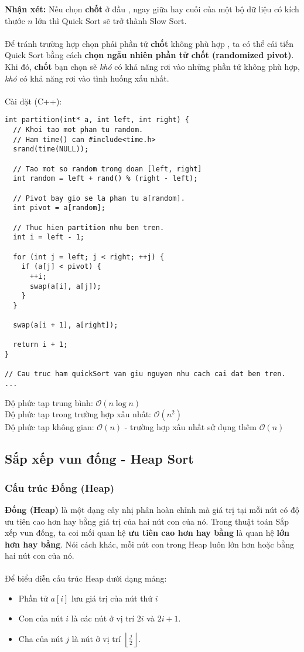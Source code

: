 \documentclass[]{article}
\begin{document}
\textbf{Nhận xét:} Nếu chọn \textbf{chốt} ở đầu , ngay giữa hay cuối của một bộ dữ liệu có kích thước $n$ lớn thì Quick Sort sẽ trở thành Slow Sort.
\\\\
Để tránh trường hợp chọn phải phần tử \textbf{chốt} không phù hợp , ta có thể cải tiến Quick Sort bằng cách \textbf{chọn ngẫu nhiên phần tử chốt (randomized pivot)}. Khi đó, \textbf{chốt} bạn chọn sẽ \textit{khó} có khả năng rơi vào những phần tử không phù hợp, \textit{khó} có khả năng rơi vào tình huống xấu nhất. \cite{LMHoang}
\\\\
Cài đặt (C++):
\begin{lstlisting}
int partition(int* a, int left, int right) {
  // Khoi tao mot phan tu random.
  // Ham time() can #include<time.h>
  srand(time(NULL));

  // Tao mot so random trong doan [left, right]
  int random = left + rand() % (right - left);

  // Pivot bay gio se la phan tu a[random].
  int pivot = a[random];

  // Thuc hien partition nhu ben tren.
  int i = left - 1;

  for (int j = left; j < right; ++j) {
    if (a[j] < pivot) {
      ++i;
      swap(a[i], a[j]);
    }
  }

  swap(a[i + 1], a[right]);

  return i + 1;
}

// Cau truc ham quickSort van giu nguyen nhu cach cai dat ben tren.
...
\end{lstlisting}
Độ phức tạp trung bình: $\mathcal{O}(n \log n)$
\\
Độ phức tạp trong trường hợp xấu nhất: $\mathcal{O}(n^2)$
\\
Độ phức tạp không gian: $\mathcal{O}(n)$ - trường hợp xấu nhất sử dụng thêm $\mathcal{O}(n)$

\subsection{Sắp xếp vun đống - Heap Sort}
\subsubsection{Cấu trúc Đống (Heap)}
\textbf{Đống (Heap)} là một dạng cây nhị phân hoàn chỉnh mà giá trị tại mỗi nút có độ ưu tiên cao hơn hay bằng giá trị của hai nút con của nó. Trong thuật toán Sắp xếp vun đống, ta coi mối quan hệ \textbf{ưu tiên cao hơn hay bằng} là quan hệ \textbf{lớn hơn hay bằng}.\cite{LMHoang} Nói cách khác, mỗi nút con trong Heap luôn lớn hơn hoặc bằng hai nút con của nó.
\\\\
Để biểu diễn cấu trúc Heap dưới dạng mảng:
\begin{itemize}
\item Phần tử $a[i]$ lưu giá trị của nút thứ $i$
\item Con của nút $i$ là các nút ở vị trí $2i$ và $2i + 1$.
\item Cha của nút $j$ là nút ở vị trí $\displaystyle \left\lfloor\frac{j}{2}\right\rfloor$.
\end{itemize}
\end{document}
